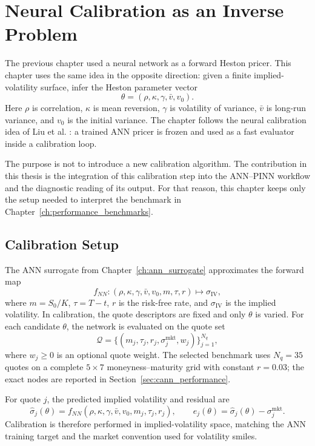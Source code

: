 \chapter{Neural Calibration as an Inverse Problem}
\label{ch:cann}

The previous chapter used a neural network as a forward Heston pricer. This chapter uses the same idea in the opposite direction: given a finite implied-volatility surface, infer the Heston parameter vector
\[
\theta=(\rho,\kappa,\gamma,\bar v,v_0).
\]
Here \(\rho\) is correlation, \(\kappa\) is mean reversion, \(\gamma\) is volatility of variance, \(\bar v\) is long-run variance, and \(v_0\) is the initial variance. The chapter follows the neural calibration idea of Liu et al. \cite{liu}: a trained ANN pricer is frozen and used as a fast evaluator inside a calibration loop.

The purpose is not to introduce a new calibration algorithm. The contribution in this thesis is the integration of this calibration step into the ANN--PINN workflow and the diagnostic reading of its output. For that reason, this chapter keeps only the setup needed to interpret the benchmark in Chapter~\ref{ch:performance_benchmarks}.

\section{Calibration Setup}

The ANN surrogate from Chapter~\ref{ch:ann_surrogate} approximates the forward map
\[
f_{NN}:(\rho,\kappa,\gamma,\bar v,v_0,m,\tau,r)\mapsto \sigma_{\mathrm{IV}},
\]
where \(m=S_0/K\), \(\tau=T-t\), \(r\) is the risk-free rate, and \(\sigma_{\mathrm{IV}}\) is the implied volatility. In calibration, the quote descriptors are fixed and only \(\theta\) is varied. For each candidate \(\theta\), the network is evaluated on the quote set
\[
\mathcal{Q}=\{(m_j,\tau_j,r_j,\sigma^{\mathrm{mkt}}_j,w_j)\}_{j=1}^{N_q},
\]
where \(w_j\geq0\) is an optional quote weight. The selected benchmark uses \(N_q=35\) quotes on a complete \(5\times7\) moneyness--maturity grid with constant \(r=0.03\); the exact nodes are reported in Section~\ref{sec:cann_performance}.

For quote \(j\), the predicted implied volatility and residual are
\[
\hat\sigma_j(\theta)=f_{NN}(\rho,\kappa,\gamma,\bar v,v_0,m_j,\tau_j,r_j),
\qquad
e_j(\theta)=\hat\sigma_j(\theta)-\sigma^{\mathrm{mkt}}_j.
\]
Calibration is therefore performed in implied-volatility space, matching the ANN training target and the market convention used for volatility smiles.

